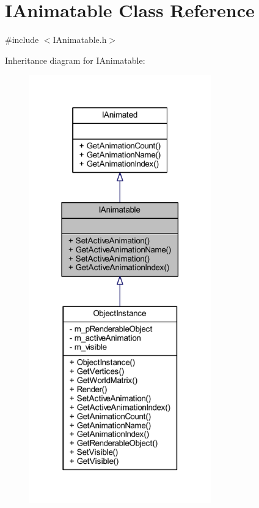 \hypertarget{class_i_animatable}{}\section{I\+Animatable Class Reference}
\label{class_i_animatable}


{\ttfamily \#include $<$I\+Animatable.\+h$>$}



Inheritance diagram for I\+Animatable\+:\nopagebreak
\begin{figure}[H]
\begin{center}
\leavevmode
\includegraphics[width=223pt]{class_i_animatable__inherit__graph}
\end{center}
\end{figure}


